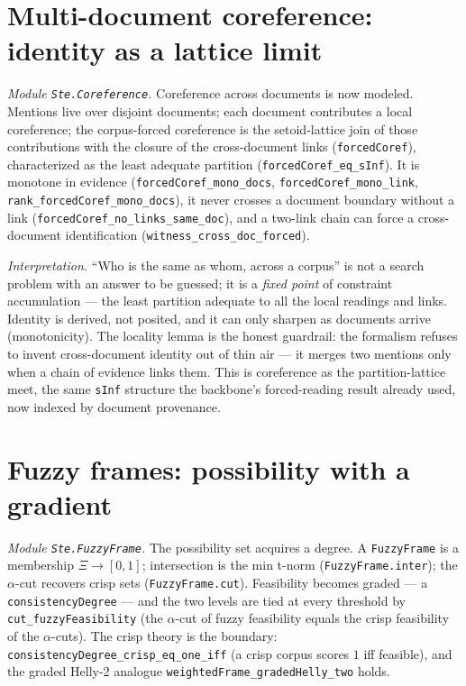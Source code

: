 \documentclass[11pt]{article}
\newcommand{\code}[1]{\texttt{#1}}
\begin{document}
\section{Multi-document coreference: identity as a lattice limit}
\emph{Module \code{Ste.Coreference}.}
Coreference across documents is now modeled.  Mentions live over
disjoint documents; each document contributes a local coreference; the
corpus-forced coreference is the setoid-lattice join of those
contributions with the closure of the cross-document links
(\code{forcedCoref}), characterized as the least adequate partition
(\code{forcedCoref\_eq\_sInf}).  It is monotone in evidence
(\code{forcedCoref\_mono\_docs}, \code{forcedCoref\_mono\_link},
\code{rank\_forcedCoref\_mono\_docs}), it never crosses a document
boundary without a link (\code{forcedCoref\_no\_links\_same\_doc}), and a
two-link chain can force a cross-document identification
(\code{witness\_cross\_doc\_forced}).

\emph{Interpretation.} ``Who is the same as whom, across a corpus'' is
not a search problem with an answer to be guessed; it is a
\emph{fixed point} of constraint accumulation --- the least partition
adequate to all the local readings and links.  Identity is derived, not
posited, and it can only sharpen as documents arrive
(monotonicity).  The locality lemma is the honest guardrail: the
formalism refuses to invent cross-document identity out of thin air ---
it merges two mentions only when a chain of evidence links them.  This is
coreference as the partition-lattice meet, the same \code{sInf} structure
the backbone's forced-reading result already used, now indexed by
document provenance.

\section{Fuzzy frames: possibility with a gradient}
\emph{Module \code{Ste.FuzzyFrame}.}
The possibility set acquires a degree.  A \code{FuzzyFrame} is a
membership $\Xi \to [0,1]$; intersection is the min t-norm
(\code{FuzzyFrame.inter}); the $\alpha$-cut recovers crisp sets
(\code{FuzzyFrame.cut}).  Feasibility becomes graded --- a
\code{consistencyDegree} --- and the two levels are tied at every
threshold by \code{cut\_fuzzyFeasibility} (the $\alpha$-cut of fuzzy
feasibility equals the crisp feasibility of the $\alpha$-cuts).  The
crisp theory is the boundary: \code{consistencyDegree\_crisp\_eq\_one\_iff}
(a crisp corpus scores $1$ iff feasible), and the graded Helly-2 analogue
\code{weightedFrame\_gradedHelly\_two} holds.
\end{document}
